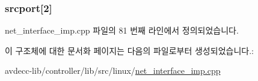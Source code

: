 \subsubsection[{\texorpdfstring{srcport}{srcport}}]{ srcport\mbox{[}2\mbox{]}}\hypertarget{structavdecc__lib_1_1udpheader_a16c2e21bb8af61debc522ff7128278d7}{}\label{structavdecc__lib_1_1udpheader_a16c2e21bb8af61debc522ff7128278d7}


net\+\_\+interface\+\_\+imp.\+cpp 파일의 81 번째 라인에서 정의되었습니다.



이 구조체에 대한 문서화 페이지는 다음의 파일로부터 생성되었습니다.\+:\begin{DoxyCompactItemize}
\item 
avdecc-\/lib/controller/lib/src/linux/\hyperlink{linux_2net__interface__imp_8cpp}{net\+\_\+interface\+\_\+imp.\+cpp}\end{DoxyCompactItemize}
